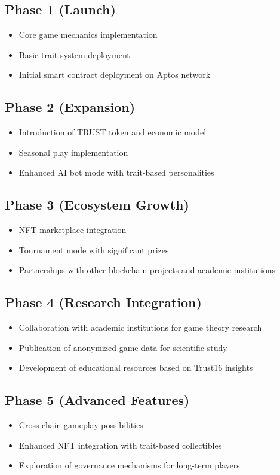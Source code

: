 \documentclass[12pt,a4paper]{article}
\begin{document}
\subsection{Phase 1 (Launch)}
\begin{itemize}
    \item Core game mechanics implementation
    \item Basic trait system deployment
    \item Initial smart contract deployment on Aptos network
\end{itemize}

\subsection{Phase 2 (Expansion)}
\begin{itemize}
    \item Introduction of TRUST token and economic model
    \item Seasonal play implementation
    \item Enhanced AI bot mode with trait-based personalities
\end{itemize}

\subsection{Phase 3 (Ecosystem Growth)}
\begin{itemize}
    \item NFT marketplace integration
    \item Tournament mode with significant prizes
    \item Partnerships with other blockchain projects and academic institutions
\end{itemize}

\subsection{Phase 4 (Research Integration)}
\begin{itemize}
    \item Collaboration with academic institutions for game theory research
    \item Publication of anonymized game data for scientific study
    \item Development of educational resources based on Trust16 insights
\end{itemize}

\subsection{Phase 5 (Advanced Features)}
\begin{itemize}
    \item Cross-chain gameplay possibilities
    \item Enhanced NFT integration with trait-based collectibles
    \item Exploration of governance mechanisms for long-term players
\end{itemize}
\end{document}
